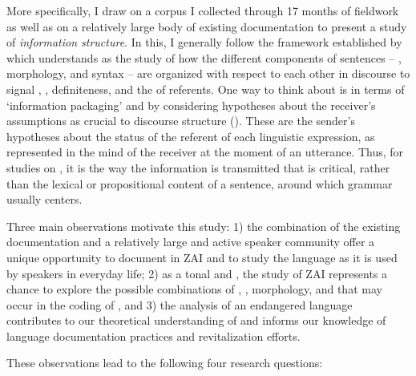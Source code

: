 More specifically, I draw on a corpus I collected through 17 months of fieldwork as well as on a relatively large body of existing documentation to present a study of \textit{information structure}. In this, I generally follow the framework established by \citet{lambrecht1994} which understands  as the study of how the different components of sentences -- , morphology, and syntax -- are organized with respect to each other in discourse to signal , , definiteness, and the  of referents. One way to think about  is in terms of `information packaging' and by considering hypotheses about the receiver's assumptions as crucial to discourse structure (\citealt{chafe1994,lambrecht1994}). These are the sender's hypotheses about the status of the referent of each linguistic expression, as represented in the mind of the receiver at the moment of an utterance. Thus, for studies on , it is the way the information is transmitted that is critical, rather than the lexical or propositional content of a sentence, around which grammar usually centers.

Three main observations motivate this study: 1) the combination of the existing documentation and a relatively large and active speaker community offer a unique opportunity to document  in ZAI and to study the language as it is used by speakers in everyday life; 2) as a tonal and , the study of ZAI represents a chance to explore the possible combinations of , , morphology, and  that may occur in the coding of , and 3) the analysis of an endangered language contributes to our theoretical understanding of  and informs our knowledge of language documentation practices and revitalization efforts. 

These observations lead to the following four research questions: 

